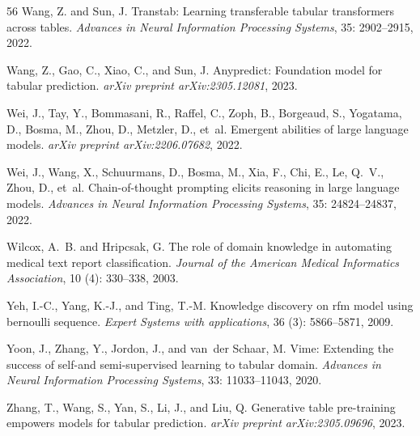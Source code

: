 \documentclass{article}
\theoremstyle{plain}
\theoremstyle{definition}
\theoremstyle{remark}
\begin{document}
\begin{thebibliography}{56}
Wang, Z. and Sun, J.
\newblock Transtab: Learning transferable tabular transformers across tables.
\newblock \emph{Advances in Neural Information Processing Systems},
  35: 2902--2915, 2022.

Wang, Z., Gao, C., Xiao, C., and Sun, J.
\newblock Anypredict: Foundation model for tabular prediction.
\newblock \emph{arXiv preprint arXiv:2305.12081}, 2023.

Wei, J., Tay, Y., Bommasani, R., Raffel, C., Zoph, B., Borgeaud, S., Yogatama,
  D., Bosma, M., Zhou, D., Metzler, D., et~al.
\newblock Emergent abilities of large language models.
\newblock \emph{arXiv preprint arXiv:2206.07682}, 2022{}.

Wei, J., Wang, X., Schuurmans, D., Bosma, M., Xia, F., Chi, E., Le, Q.~V.,
  Zhou, D., et~al.
\newblock Chain-of-thought prompting elicits reasoning in large language
  models.
\newblock \emph{Advances in Neural Information Processing Systems},
  35: 24824--24837, 2022{}.

Wilcox, A.~B. and Hripcsak, G.
\newblock The role of domain knowledge in automating medical text report
  classification.
\newblock \emph{Journal of the American Medical Informatics Association},
  10 (4): 330--338, 2003.

Yeh, I.-C., Yang, K.-J., and Ting, T.-M.
\newblock Knowledge discovery on rfm model using bernoulli sequence.
\newblock \emph{Expert Systems with applications}, 36 (3):
  5866--5871, 2009.

Yoon, J., Zhang, Y., Jordon, J., and van~der Schaar, M.
\newblock Vime: Extending the success of self-and semi-supervised learning to
  tabular domain.
\newblock \emph{Advances in Neural Information Processing Systems},
  33: 11033--11043, 2020.

Zhang, T., Wang, S., Yan, S., Li, J., and Liu, Q.
\newblock Generative table pre-training empowers models for tabular prediction.
\newblock \emph{arXiv preprint arXiv:2305.09696}, 2023.


\end{thebibliography}
\end{document}
